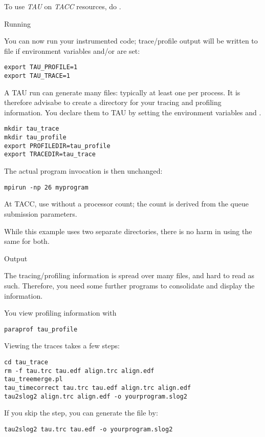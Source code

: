 \begin{istc}
To use \emph{TAU} on \emph{TACC} resources,
do .
\end{istc}

 {Running}

You can now run your instrumented code;
trace/profile output will be written to file 
if environment variables  and/or  are set:
\begin{verbatim}
export TAU_PROFILE=1
export TAU_TRACE=1
\end{verbatim}

A TAU run can generate many files: typically at least one per process.
It is therefore advisabe to create a directory for your tracing and profiling
information. You declare them to TAU by setting the environment variables
 and .
\begin{verbatim}
mkdir tau_trace
mkdir tau_profile
export PROFILEDIR=tau_profile
export TRACEDIR=tau_trace
\end{verbatim}

The actual program invocation is then unchanged:
\begin{verbatim}
mpirun -np 26 myprogram
\end{verbatim}

\begin{taccnote}
At TACC, use  without a processor count;
the count is derived from the queue submission parameters.
\end{taccnote}

While this example uses two separate directories, there is no
harm in using the same for both.

 {Output}

The tracing/profiling information is spread over many files, and hard to read as such.
Therefore, you need some further programs to consolidate and display the information.

You view profiling information with 
\begin{verbatim}
paraprof tau_profile
\end{verbatim}
Viewing the traces takes a few steps:
\begin{verbatim}
cd tau_trace
rm -f tau.trc tau.edf align.trc align.edf
tau_treemerge.pl
tau_timecorrect tau.trc tau.edf align.trc align.edf
tau2slog2 align.trc align.edf -o yourprogram.slog2
\end{verbatim}
If you skip the  step, you can generate the
 file by:
\begin{verbatim}
tau2slog2 tau.trc tau.edf -o yourprogram.slog2
\end{verbatim}

